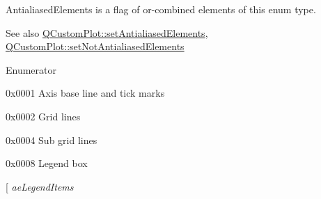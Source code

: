 {\ttfamily Antialiased\+Elements} is a flag of or-\/combined elements of this enum type.

\begin{DoxySeeAlso}{See also}
\hyperlink{class_q_custom_plot_af6f91e5eab1be85f67c556e98c3745e8}{Q\+Custom\+Plot\+::set\+Antialiased\+Elements}, \hyperlink{class_q_custom_plot_ae10d685b5eabea2999fb8775ca173c24}{Q\+Custom\+Plot\+::set\+Not\+Antialiased\+Elements} 
\end{DoxySeeAlso}
\begin{Desc}
\item[Enumerator]\par
\begin{description}
\item[{\em 
\hypertarget{namespace_q_c_p_ae55dbe315d41fe80f29ba88100843a0caefa92e89cd37f8a081fd2075aa1af73f}{}ae\+Axes\label{namespace_q_c_p_ae55dbe315d41fe80f29ba88100843a0caefa92e89cd37f8a081fd2075aa1af73f}
}]{\ttfamily 0x0001} Axis base line and tick marks \item[{\em 
\hypertarget{namespace_q_c_p_ae55dbe315d41fe80f29ba88100843a0ca4fbb37118d62288af0ca601ff2b07a2f}{}ae\+Grid\label{namespace_q_c_p_ae55dbe315d41fe80f29ba88100843a0ca4fbb37118d62288af0ca601ff2b07a2f}
}]{\ttfamily 0x0002} Grid lines \item[{\em 
\hypertarget{namespace_q_c_p_ae55dbe315d41fe80f29ba88100843a0caaedf83369188a15a69f92bb1d85ca97b}{}ae\+Sub\+Grid\label{namespace_q_c_p_ae55dbe315d41fe80f29ba88100843a0caaedf83369188a15a69f92bb1d85ca97b}
}]{\ttfamily 0x0004} Sub grid lines \item[{\em 
\hypertarget{namespace_q_c_p_ae55dbe315d41fe80f29ba88100843a0ca9e0127a6361b5d0596b031a482c5cf97}{}ae\+Legend\label{namespace_q_c_p_ae55dbe315d41fe80f29ba88100843a0ca9e0127a6361b5d0596b031a482c5cf97}
}]{\ttfamily 0x0008} Legend box \item[{\em 
\hypertarget{namespace_q_c_p_ae55dbe315d41fe80f29ba88100843a0ca1aca7a50c1b95403958733a4acafe773}{}ae\+Legend\+Items\label{namespace_q_c_p_ae55dbe315d41fe80f29ba88100843a0ca1aca7a50c1b95403958733a4acafe773}
}
\end{description}
\end{Desc}
